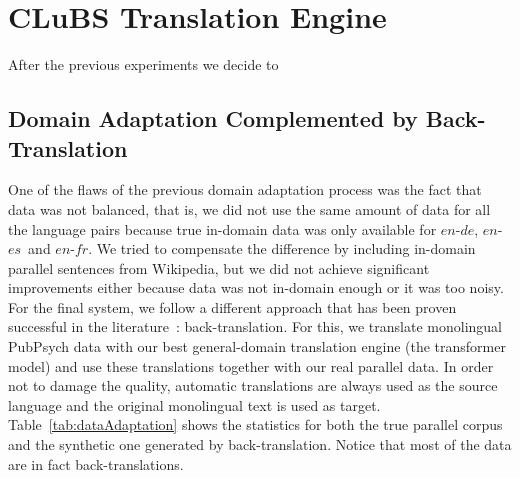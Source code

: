 \documentclass[a4paper,11pt]{article}
\newcommand{\en}{$en$}
\newcommand{\es}{$es$}
\newcommand{\fr}{$fr$}
\newcommand{\de}{$de$}
\begin{document}


\section{CLuBS Translation Engine}
\label{s:finalNMT}

After the previous experiments we decide to 


\subsection{Domain Adaptation Complemented by Back-Translation}

One of the flaws of the previous domain adaptation process was the fact that data was not balanced, that is, we did not use the same amount of data for all the language pairs because true in-domain data was only available for \en-\de, \en-\es\ and \en-\fr. We tried to compensate the difference by including in-domain parallel sentences from Wikipedia, but we did not achieve significant improvements either because data was not in-domain enough or it was too noisy. For the final system, we follow a different approach that has been proven successful in the literature~\cite{sennrichEtal:2016}: back-translation. For this, we translate monolingual PubPsych data with our best general-domain translation engine (the transformer model) and use these translations together with our real parallel data. In order not to damage the quality, automatic translations are always used as the source language and the original monolingual text is used as target. Table~\ref{tab:dataAdaptation} shows the statistics for both the true parallel corpus and the synthetic one generated by back-translation. Notice that most of the data are in fact back-translations.
\end{document}
